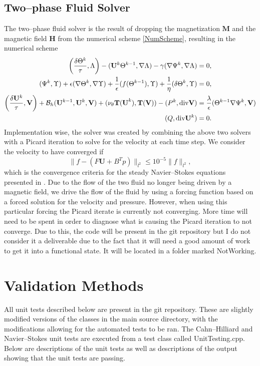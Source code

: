 \documentclass[11pt,fullpage]{article}
\newcommand{\norm}[1]{\|#1\|}
\newcommand{\eps}{\epsilon}
\newcommand{\grad}{\nabla}
\newcommand{\diver}{\textup{div} }
\theoremstyle{lemma}
\theoremstyle{definition}
\theoremstyle{lemma}
\begin{document}
\subsection{Two--phase Fluid Solver}
The two--phase fluid solver is the result of dropping the magnetization $\mathbf{M}$ and the magnetic field $\mathbf{H}$ from the numerical scheme \ref{NumScheme}, resulting in the numerical scheme
\begin{align*}
\bigg(\frac{\delta\Theta^k}{\tau}, \Lambda\bigg) - (\mathbf{U}^k\Theta^{k-1}, \grad\Lambda) - \gamma(\grad \Psi^k, \grad \Lambda)&=0,\\
(\Psi^k, \Upsilon) + \eps(\grad \Theta^k, \grad \Upsilon) + \frac{1}{\eps}(f(\Theta^{k-1}), \Upsilon) + \frac{1}{\eta}(\delta\Theta^k, \Upsilon) &= 0,\\
\bigg(\frac{\delta\mathbf{U}^k}{\tau}, \mathbf{V}\bigg) + \mathcal{B}_h(\mathbf{U}^{k-1}, \mathbf{U}^k, \mathbf{V}) + (\nu_\theta\mathbf{T(U}^k), \mathbf{T(V)}) - (P^k, \diver \mathbf{V}) &= \frac{\lambda}{\eps}(\Theta^{k-1}\grad \Psi^k, \mathbf{V})\\
(Q, \diver\mathbf{U}^k) &= 0.
\end{align*}
Implementation wise, the solver was created by combining the above two solvers with a Picard iteration to solve for the velocity at each time step. We consider the velocity to have converged if 
$$
	\norm{f - (F\mathbf{U} + B^T p)}_{l^2} \leq 10^{-5}\norm{f}_{l^2},
$$
which is the convergence criteria for the steady Navier--Stokes equations presented in \cite{Precond}. Due to the flow of the two fluid no longer being driven by a magnetic field, we drive the flow of the fluid by using a forcing function based on a forced solution for the velocity and pressure. However, when using this particular forcing the Picard iterate is currently not converging. More time will need to be spent in order to diagnose what is causing the Picard iteration to not converge. Due to this, the code will be present in the git repository but I do not consider it a deliverable due to the fact that it will need a good amount of work to get it into a functional state. It will be located in a folder marked NotWorking.


\section{Validation Methods}
All unit tests described below are present in the git repository. These are slightly modified versions of the classes in the main source directory, with the modifications allowing for the automated tests to be ran. The Cahn--Hilliard and Navier--Stokes unit tests are executed from a test class called UnitTesting.cpp. Below are descriptions of the unit tests as well as descriptions of the output showing that the unit tests are passing.
\end{document}
